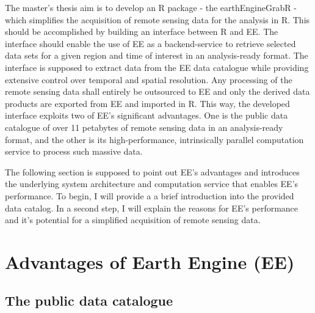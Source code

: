 The master's thesis aim is to develop an R package - the earthEngineGrabR - which simplifies the acquisition of remote sensing data for the analysis in R. This should be accomplished by building an interface between R and EE.
The interface should enable the use of EE as a backend-service to retrieve selected data sets for a given region and time of interest in an analysis-ready format. The interface is supposed to extract data from the EE data catalogue while providing extensive control over temporal and spatial resolution. 
Any processing of the remote sensing data shall entirely be outsourced to EE and only the derived data products are exported from EE and imported in R. This way, the developed interface exploits two of EE's significant advantages. One is the public data catalogue of over 11 petabytes of remote sensing data in an analysis-ready format, and the other is its high-performance, intrinsically parallel computation service to process such massive data.


The following section is supposed to point out EE's advantages and introduces the underlying system architecture and computation service that enables EE's performance. To begin, I will provide a a brief introduction into the provided data catalog. In a second step, I will explain the reasons for EE's performance and it's potential for a simplified acquisition of remote sensing data.

\section{Advantages of Earth Engine (EE)}

\subsection{The public data catalogue}

